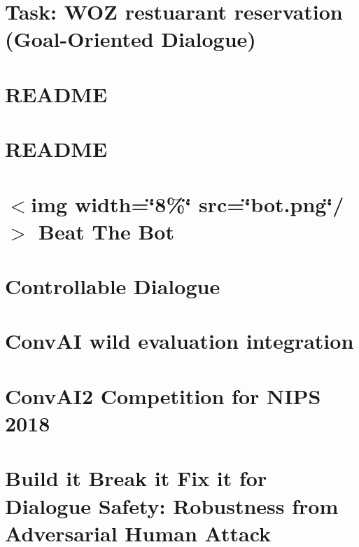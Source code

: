 \documentclass[twoside]{book}
\newcommand{\+}{\discretionary{\mbox{\scriptsize$\hookleftarrow$}}{}{}}
\begin{document}
\chapter{Task\+: W\+OZ restuarant reservation (Goal-\/\+Oriented Dialogue)}
\label{md_parlai_tasks_woz_README}

\chapter{R\+E\+A\+D\+ME}
\label{md_parlai_zoo_pretrained_transformers_README}

\chapter{R\+E\+A\+D\+ME}
\label{md_parlai_zoo_README}

\chapter{$<$img width=\char`\"{}8\%\char`\"{} src=\char`\"{}bot.\+png\char`\"{}/$>$ Beat The Bot}
\label{md_projects_beat_the_bot_README}

\chapter{Controllable Dialogue}
\label{md_projects_controllable_dialogue_README}

\chapter{Conv\+AI \textquotesingle{}wild\textquotesingle{} evaluation integration}
\label{md_projects_convai_README}

\chapter{Conv\+A\+I2 Competition for N\+I\+PS 2018}
\label{md_projects_convai2_README}

\chapter{Build it Break it Fix it for Dialogue Safety\+: Robustness from Adversarial Human Attack}
\label{md_projects_dialogue_safety_README}

\end{document}
